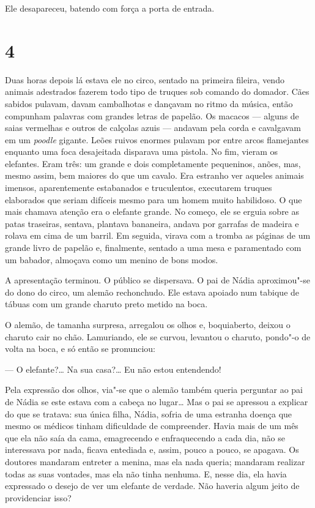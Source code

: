 Ele desapareceu, batendo com força a porta de entrada.

\section{4}

Duas horas depois lá estava ele no circo, sentado na primeira fileira,
vendo animais adestrados fazerem todo tipo de truques sob comando do
domador. Cães sabidos pulavam, davam cambalhotas e dançavam no ritmo da
música, então compunham palavras com grandes letras de papelão. Os
macacos --- alguns de saias vermelhas e outros de calçolas azuis ---
andavam pela corda e cavalgavam em um \emph{poodle} gigante. Leões
ruivos enormes pulavam por entre arcos flamejantes enquanto uma foca
desajeitada disparava uma pistola. No fim, vieram os elefantes. Eram
três: um grande e dois completamente pequeninos, anões, mas, mesmo
assim, bem maiores do que um cavalo. Era estranho ver aqueles animais
imensos, aparentemente estabanados e truculentos, executarem truques elaborados que seriam difíceis mesmo para um homem muito
habilidoso. O que mais chamava atenção era o elefante grande. No
começo, ele se erguia sobre as patas traseiras, sentava, plantava
bananeira, andava por garrafas de madeira e rolava em cima de um
barril. Em seguida, virava com a tromba as páginas de um grande livro de
papelão e, finalmente, sentado a uma mesa e paramentado com um babador,
almoçava como um menino de bons modos.

A apresentação terminou. O público se dispersava. O pai de Nádia
aproximou"-se do dono do circo, um alemão rechonchudo. Ele estava apoiado
num tabique de tábuas com um grande charuto preto metido na boca.


O alemão, de tamanha surpresa, arregalou os olhos e, boquiaberto, deixou
o charuto cair no chão. Lamuriando, ele se curvou, levantou o charuto,
pondo"-o de volta na boca, e só então se pronunciou:

--- O elefante?\ldots{} Na sua casa?\ldots{} Eu não estou entendendo!

Pela expressão dos olhos, via"-se que o alemão também queria perguntar ao
pai de Nádia se este estava com a cabeça no lugar\ldots{} Mas o pai se
apressou a explicar do que se tratava: sua única filha, Nádia, sofria de
uma estranha doença que mesmo os médicos tinham dificuldade de
compreender. Havia mais de um mês que ela não saía da cama, emagrecendo
e enfraquecendo a cada dia, não se interessava por nada, ficava
entediada e, assim, pouco a pouco, se apagava. Os doutores mandaram
entreter a menina, mas ela nada queria; mandaram realizar todas as suas
vontades, mas ela não tinha nenhuma. E, nesse dia, ela havia expressado
o desejo de ver um elefante de verdade. Não haveria algum jeito de
providenciar isso?

